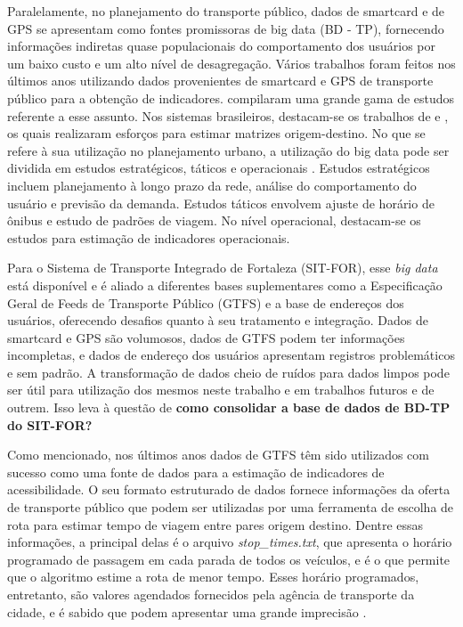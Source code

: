 \documentclass[        
    a4paper,          %
    12pt,             %
    chapter=TITLE,    %
    section=Title,    %
    subsection=Title, %
    oneside,          %
    english,          %
    spanish,          %
    brazil,           %
    fleqn             %
]{abntex2}
\begin{document}
  Paralelamente, no planejamento do transporte público, dados de smartcard e de GPS se apresentam como fontes promissoras de big data (BD - TP), fornecendo informações indiretas quase populacionais do comportamento dos usuários por um baixo custo e um alto nível de desagregação. Vários trabalhos foram feitos nos últimos anos utilizando dados provenientes de smartcard e GPS de transporte público para a obtenção de indicadores. \citet{Kurauchi2017} compilaram uma grande gama de estudos referente a esse assunto. Nos sistemas brasileiros, destacam-se os trabalhos de \citet{Farzin2008} e \citet{Arbex2017}, os quais realizaram esforços para estimar matrizes origem-destino. No que se refere à sua utilização no planejamento urbano, a utilização do big data pode ser dividida em estudos estratégicos, táticos e operacionais \citep{Pelletier2011}. Estudos estratégicos incluem planejamento à longo prazo da rede, análise do comportamento do usuário e previsão da demanda. Estudos táticos envolvem ajuste de horário de ônibus e estudo de padrões de viagem. No nível operacional, destacam-se os estudos para estimação de indicadores operacionais.
  
  Para o Sistema de Transporte Integrado de Fortaleza (SIT-FOR), esse \emph{big data} está disponível e é aliado a diferentes bases suplementares como a Especificação Geral de Feeds de Transporte Público (GTFS) e a base de endereços dos usuários, oferecendo desafios quanto à seu tratamento e integração. Dados de smartcard e GPS são volumosos, dados de GTFS podem ter informações incompletas, e dados de endereço dos usuários apresentam registros problemáticos e sem padrão. A transformação de dados cheio de ruídos para dados limpos pode ser útil para utilização dos mesmos neste trabalho e em trabalhos futuros e de outrem. Isso leva à questão de \textbf{como consolidar a base de dados de BD-TP do SIT-FOR?}
  
  Como mencionado, nos últimos anos dados de GTFS têm sido utilizados com sucesso como uma fonte de dados para a estimação de indicadores de acessibilidade. O seu formato estruturado de dados fornece informações da oferta de transporte público que podem ser utilizadas por uma ferramenta de escolha de rota para estimar tempo de viagem entre pares origem destino. Dentre essas informações, a principal delas é o arquivo \emph{stop\_times.txt}, que apresenta o horário programado de passagem em cada parada de todos os veículos, e é o que permite que o algoritmo estime a rota de menor tempo. Esses horário programados, entretanto, são valores agendados fornecidos pela agência de transporte da cidade, e é sabido que podem apresentar uma grande imprecisão \citep{Wessel2019}.
  
\end{document}
